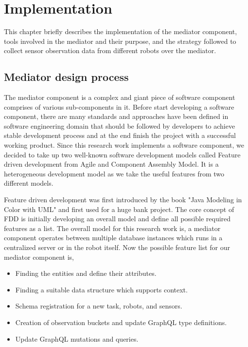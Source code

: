 

	\let\cleardoublepage\clearpage
\chapter{Implementation}
This chapter briefly describes the implementation of the mediator component, tools involved in the mediator and their purpose, and the strategy followed to collect sensor observation data from different robots over the mediator. 

	\section{Mediator design process}
	The mediator component is a complex and giant piece of software component comprises of various sub-components in it. Before start developing a software component, there are many standards and approaches have been defined in software engineering domain that should be followed by developers to achieve stable development process and at the end finish the project with a successful working product. Since this research work implements a software component, we decided to take up two well-known software development models called Feature driven development from Agile and Component Assembly Model. It is a heterogeneous development model as we take the useful features from two different models.
	
	Feature driven development was first introduced by the book "Java Modeling in Color with UML" \cite{misc15} and first used for a huge bank project. The core concept of FDD is initially developing an overall model and define all possible required features as a list. The overall model for this research work is, a mediator component operates between multiple database instances which runs in a centralized server or in the robot itself. Now the possible feature list for our mediator component is, 
	
	\begin{itemize}
		\item Finding the entities and define their attributes.
		\item Finding a suitable data structure which supports context.
		\item Schema registration for a new task, robots, and sensors.
		\item Creation of observation buckets and update GraphQL type definitions.
		\item Update GraphQL mutations and queries.
	\end{itemize}
	
